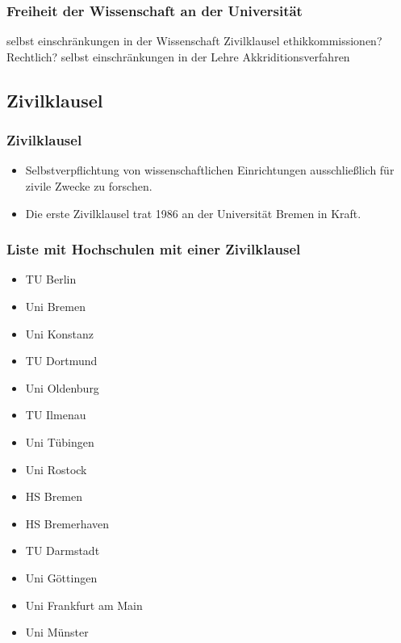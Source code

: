 \begin{frame}
\frametitle{Freiheit der Wissenschaft an der Universität}
selbst einschränkungen in der Wissenschaft
    Zivilklausel
    ethikkommissionen? Rechtlich?
    selbst einschränkungen in der Lehre
    Akkriditionsverfahren
\end{frame}

\subsection*{Zivilklausel}
\begin{frame}
\frametitle{Zivilklausel}
\begin{itemize}
\item Selbstverpflichtung von wissenschaftlichen Einrichtungen ausschließlich für zivile Zwecke zu forschen. \cite{ZivKlausel}
\item Die erste Zivilklausel trat 1986 an der Universität Bremen in Kraft.
\end{itemize}

\end{frame}

\begin{frame}
\frametitle{Liste mit Hochschulen mit einer Zivilklausel}
\begin{multicols}{2}
\begin{itemize}
\item TU Berlin
\item Uni Bremen
\item Uni Konstanz
\item TU Dortmund
\item Uni Oldenburg
\item TU Ilmenau
\item Uni Tübingen
\item Uni Rostock
\item HS Bremen
\item HS Bremerhaven
\item TU Darmstadt
\item Uni Göttingen
\item Uni Frankfurt am Main
\item Uni Münster
\end{itemize}
\end{multicols}

\end{frame}

